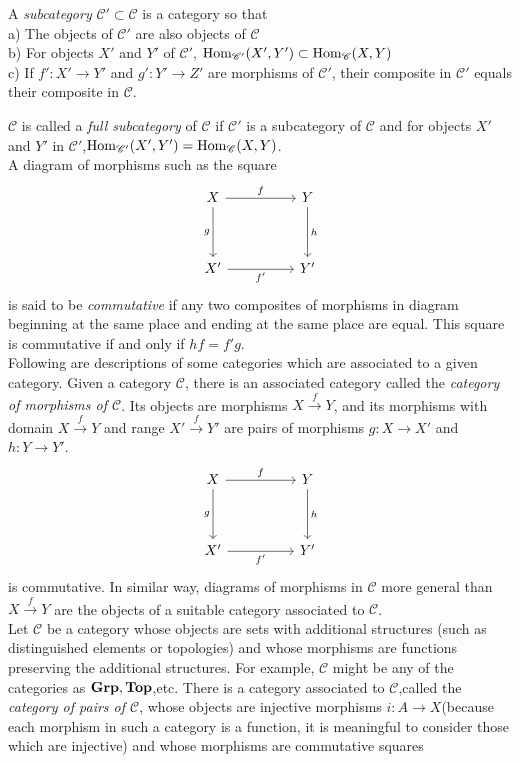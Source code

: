 \documentclass{article}
\begin{document}
\begin{definition}
A \emph{subcategory} $\mathscr{C'} \subset \mathscr{C}$ is a category so that\\
a) The objects of $\mathscr{C}'$ are also objects of $\mathscr{C}$\\
b) For objects $X'$ and $Y'$ of $\mathscr{C}'$, $\operatorname{Hom}_{\mathscr{C}'}(X',Y') \subset \operatorname{Hom}_{\mathscr{C}}(X,Y)$\\
c) If $f' : X' \to Y'$ and $g' : Y' \to Z'$ are morphisms of $\mathscr{C}'$, their composite in $\mathscr{C}'$ equals their composite in $\mathscr{C}$.
\end{definition}
$\mathscr{C}$ is called a \emph{full subcategory} of $\mathscr{C}$ if $\mathscr{C}'$ is a subcategory of $\mathscr{C}$ and for objects $X'$ and $Y'$ in $\mathscr{C}'$,$\operatorname{Hom}_{\mathscr{C'}}(X',Y') = \operatorname{Hom}_{\mathscr{C}}(X,Y)$.\\
A diagram of morphisms such as the square
\[\begin{tikzcd}
	X && Y \\
	\\
	{X'} && {Y'}
	\arrow["f", from=1-1, to=1-3]
	\arrow["g"', from=1-1, to=3-1]
	\arrow["h", from=1-3, to=3-3]
	\arrow["{f'}"', from=3-1, to=3-3]
\end{tikzcd}\]
is said to be \emph{commutative} if any two composites of morphisms in diagram beginning at the same place and ending at the same place are equal. This square is commutative if and only if $hf = f'g$.\\
Following are descriptions of some categories which are associated to a given category. Given a category $\mathscr{C}$, there is an associated category called the \emph{category of morphisms of $\mathscr{C}$}. Its objects are morphisms $X \xrightarrow{f} Y$, and its morphisms with domain $X \xrightarrow{f} Y$ and range $X' \xrightarrow{f} Y'$ are pairs of morphisms $g : X \to X'$ and $h : Y \to Y'$.\\
\[\begin{tikzcd}
	X && Y \\
	\\
	{X'} && {Y'}
	\arrow["f", from=1-1, to=1-3]
	\arrow["g"', from=1-1, to=3-1]
	\arrow["h", from=1-3, to=3-3]
	\arrow["{f'}"', from=3-1, to=3-3]
\end{tikzcd}\]
 is commutative. In similar way, diagrams of morphisms in $\mathscr{C}$ more general than $X \xrightarrow{f} Y$ are the objects of a suitable category associated to $\mathscr{C}$.\\
Let $\mathscr{C}$ be a category whose objects are sets with additional structures (such as distinguished elements or topologies) and whose morphisms are functions preserving the additional structures. For example, $\mathscr{C}$ might be any of the categories as $\bold{Grp},\bold{Top}$,etc. There is a category associated to $\mathscr{C}$,called the \emph{category of pairs of $\mathscr{C}$}, whose objects are injective morphisms $i : A \to X$(because each morphism in such a category is a function, it is meaningful to consider those which are injective) and whose morphisms are commutative squares
\end{document}
